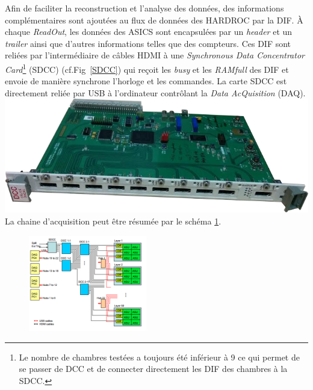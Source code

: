 Afin de faciliter la reconstruction et l'analyse des données, des informations complémentaires sont ajoutées au flux de données des HARDROC par la DIF. À chaque \textit{ReadOut}, les données des ASICS sont encapsulées par un \textit{header} et un \textit{trailer} ainsi que d'autres informations telles que des compteurs. Ces DIF sont reliées par l'intermédiaire de câbles HDMI à une \textit{Synchronous Data Concentrator Card}\footnote{Le nombre de chambres testées a toujours été inférieur à \num{9} ce qui permet de se passer de DCC et de connecter directement les DIF des chambres à la SDCC.} (SDCC) (cf.Fig~\ref{SDCC}) \cite{Baulieu:2015pfa} qui reçoit les \textit{busy} et les \textit{RAMfull} des DIF et envoie de manière synchrone l'horloge et les commandes. La carte SDCC est directement reliée par USB à l'ordinateur contrôlant la \textit{Data AcQuisition} (DAQ).
\marginpar
{
	\centering
	\includegraphics[width=\marginparwidth]{GLA/SDCC.png}
	\label{SDCC}
}
La chaine d'acquisition peut être résumée par le schéma \ref{chaine}. 
\begin{figure}[ht!]
	\centering
	\includegraphics[width=0.46\textwidth]{GLA/chaine.png}
	\label{chaine}
\end{figure}

